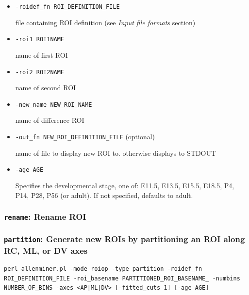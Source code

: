 \documentclass[10pt]{article}
\begin{document}
\begin{itemize}
\item {\tt -roidef\_fn ROI\_DEFINITION\_FILE}
   
file containing ROI definition (see {\it Input file formats} section)

\item {\tt -roi1 ROI1NAME}
   
name of first ROI

\item {\tt -roi2 ROI2NAME}

name of second ROI

\item {\tt -new\_name NEW\_ROI\_NAME}
   
name of difference ROI

\item {\tt -out\_fn NEW\_ROI\_DEFINITION\_FILE} (optional)

name of file to display new ROI to. otherwise displays to STDOUT

\item {\tt -age AGE}

Specifies the developmental stage, one of: E11.5, E13.5, E15.5, E18.5, P4, P14, P28, P56 (or adult). If not specified, defaults to adult.

\end{itemize}

\subsubsection*{{\tt rename}: Rename ROI}

\subsubsection*{{\tt partition}: Generate new ROIs by partitioning an ROI along RC, ML, or DV axes}

\begin{lstlisting}
perl allenminer.pl -mode roiop -type partition -roidef_fn ROI_DEFINITION_FILE -roi_basename PARTITIONED_ROI_BASENAME_ -numbins NUMBER_OF_BINS -axes <AP|ML|DV> [-fitted_cuts 1] [-age AGE]
\end{lstlisting}
\end{document}

